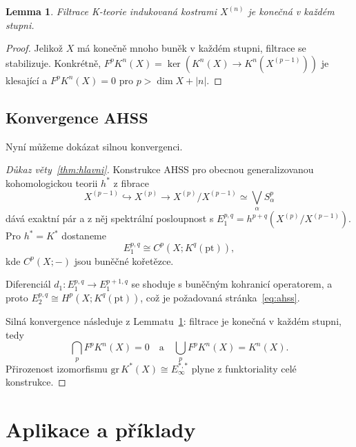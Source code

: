 \documentclass[12pt,a4paper]{article}
\theoremstyle{plain}
\newtheorem{lemma}[theorem]{Lemma}
\theoremstyle{definition}
\theoremstyle{remark}
\begin{document}
\begin{lemma}
\label{lem:filtrace}
Filtrace K-teorie indukovan\'{a} kostrami $X^{(n)}$ je kone\v{c}n\'{a}
v ka\v{z}d\'{e}m stupni.
\end{lemma}

\begin{proof}
Jeliko\v{z} $X$ m\'{a} kone\v{c}n\v{e} mnoho bun\v{e}k v ka\v{z}d\'{e}m stupni,
filtrace se stabilizuje. Konkr\'{e}tn\v{e},
$F^p K^n(X) = \ker(K^n(X) \to K^n(X^{(p-1)}))$
je klesaj\'{i}c\'{i} a $F^p K^n(X) = 0$ pro $p > \dim X + |n|$.
\end{proof}

\subsection{Konvergence AHSS}

Nyn\'{i} m\r{u}\v{z}eme dok\'{a}zat silnou konvergenci.

\begin{proof}[D\r{u}kaz v\v{e}ty~\ref{thm:hlavni}]
Konstrukce AHSS pro obecnou generalizovanou kohomologickou teorii
$h^*$ z fibrace
\[
X^{(p-1)} \hookrightarrow X^{(p)} \to X^{(p)}/X^{(p-1)} \simeq \bigvee_\alpha S^p_\alpha
\]
d\'{a}v\'{a} exaktn\'{i} p\'{a}r a z n\v{e}j spektr\'{a}ln\'{i} posloupnost s $E_1^{p,q} = h^{p+q}(X^{(p)}/X^{(p-1)})$. Pro $h^* = K^*$ dostaneme
\begin{equation}
\label{eq:e1}
E_1^{p,q} \cong C^p(X; K^q(\mathrm{pt})),
\end{equation}
kde $C^p(X; -)$ jsou bun\v{e}\v{c}n\'{e} ko\v{r}et\v{e}zce.

Diferenci\'{a}l $d_1 \colon E_1^{p,q} \to E_1^{p+1,q}$ se shoduje
s bun\v{e}\v{c}n\'{y}m kohranic\'{i} operatorem, a proto
$E_2^{p,q} \cong H^p(X; K^q(\mathrm{pt}))$, co\v{z} je po\v{z}adovan\'{a}
str\'{a}nka~\eqref{eq:ahss}.

Siln\'{a} konvergence n\'{a}sleduje z Lemmatu~\ref{lem:filtrace}:
filtrace je kone\v{c}n\'{a} v ka\v{z}d\'{e}m stupni, tedy
\[
\bigcap_p F^p K^n(X) = 0 \quad \text{a} \quad \bigcup_p F^p K^n(X) = K^n(X).
\]
P\v{r}irozenost izomorfismu $\mathrm{gr}\, K^*(X) \cong E_\infty^{*,*}$
plyne z funktoriality cel\'{e} konstrukce.
\end{proof}

\section{Aplikace a p\v{r}\'{i}klady}
\label{sec:aplikace}
\end{document}
